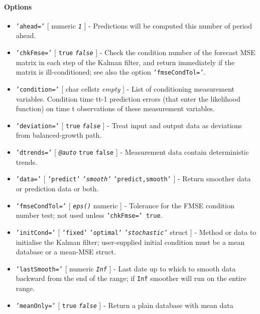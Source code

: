 \paragraph{Options}

\begin{itemize}
\item
  \texttt{'ahead='} {[} numeric \textbar{} \emph{\texttt{1}} {]} -
  Predictions will be computed this number of period ahead.
\item
  \texttt{'chkFmse='} {[} \texttt{true} \textbar{} \emph{\texttt{false}}
  {]} - Check the condition number of the forecast MSE matrix in each
  step of the Kalman filter, and return immediately if the matrix is
  ill-conditioned; see also the option \texttt{'fmseCondTol='}.
\item
  \texttt{'condition='} {[} char \textbar{} cellstr \textbar{}
  \emph{empty} {]} - List of conditioning measurement variables.
  Condition time t\textbar{}t-1 prediction errors (that enter the
  likelihood function) on time t observations of these measurement
  variables.
\item
  \texttt{'deviation='} {[} \texttt{true} \textbar{}
  \emph{\texttt{false}} {]} - Treat input and output data as deviations
  from balanced-growth path.
\item
  \texttt{'dtrends='} {[} \emph{\texttt{@auto}} \textbar{} \texttt{true}
  \textbar{} \texttt{false} {]} - Measurement data contain deterministic
  trends.
\item
  \texttt{'data='} {[} \texttt{'predict'} \textbar{}
  \emph{\texttt{'smooth'}} \textbar{} \texttt{'predict,smooth'} {]} -
  Return smoother data or prediction data or both.
\item
  \texttt{'fmseCondTol='} {[} \emph{\texttt{eps()}} \textbar{} numeric
  {]} - Tolerance for the FMSE condition number test; not used unless
  \texttt{'chkFmse=' true}.
\item
  \texttt{'initCond='} {[} \texttt{'fixed'} \textbar{}
  \texttt{'optimal'} \textbar{} \emph{\texttt{'stochastic'}} \textbar{}
  struct {]} - Method or data to initialise the Kalman filter;
  user-supplied initial condition must be a mean database or a mean-MSE
  struct.
\item
  \texttt{'lastSmooth='} {[} numeric \textbar{} \emph{\texttt{Inf}} {]}
  - Last date up to which to smooth data backward from the end of the
  range; if \texttt{Inf} smoother will run on the entire range.
\item
  \texttt{'meanOnly='} {[} \texttt{true} \textbar{}
  \emph{\texttt{false}} {]} - Return a plain database with mean data

\end{itemize}
